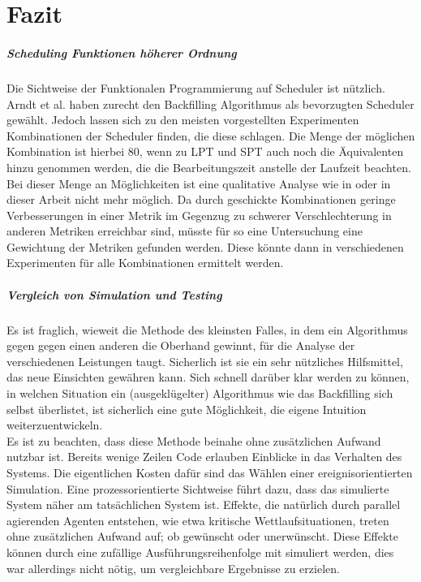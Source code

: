 \chapter{Fazit}

\paragraph{Scheduling Funktionen höherer Ordnung}
Die Sichtweise der Funktionalen Programmierung auf Scheduler ist nützlich. Arndt et al. \cite{Arn99} haben zurecht den Backfilling Algorithmus als bevorzugten Scheduler gewählt. Jedoch lassen sich zu den meisten vorgestellten Experimenten Kombinationen der Scheduler finden, die diese schlagen. Die Menge der möglichen Kombination ist hierbei 80, wenn zu LPT und SPT auch noch die Äquivalenten hinzu genommen werden, die die Bearbeitungszeit anstelle der Laufzeit beachten. Bei dieser Menge an Möglichkeiten ist eine qualitative Analyse wie in \cite{Arn99} oder in dieser Arbeit nicht mehr möglich. Da durch geschickte Kombinationen geringe Verbesserungen in einer Metrik im Gegenzug zu schwerer Verschlechterung in anderen Metriken erreichbar sind, müsste für so eine Untersuchung eine Gewichtung der Metriken gefunden werden. Diese könnte dann in verschiedenen Experimenten für alle Kombinationen ermittelt werden.


\paragraph{Vergleich von Simulation und Testing}
Es ist fraglich, wieweit die Methode des kleinsten Falles, in dem ein Algorithmus gegen gegen einen anderen die Oberhand gewinnt, für die Analyse der verschiedenen Leistungen taugt. Sicherlich ist sie ein sehr nützliches Hilfsmittel, das neue Einsichten gewähren kann. Sich schnell darüber klar werden zu können, in welchen Situation ein (ausgeklügelter) Algorithmus wie das Backfilling sich selbst überlistet, ist sicherlich eine gute Möglichkeit, die eigene Intuition weiterzuentwickeln.\\
Es ist zu beachten, dass diese Methode beinahe ohne zusätzlichen Aufwand nutzbar ist. Bereits wenige Zeilen Code erlauben Einblicke in das Verhalten des Systems. Die eigentlichen Kosten dafür sind das Wählen einer ereignisorientierten Simulation. Eine prozessorientierte Sichtweise führt dazu, dass das simulierte System näher am tatsächlichen System ist. Effekte, die natürlich durch parallel agierenden Agenten entstehen, wie etwa kritische Wettlaufsituationen, treten ohne zusätzlichen Aufwand auf; ob gewünscht oder unerwünscht. Diese Effekte können durch eine zufällige Ausführungsreihenfolge mit simuliert werden, dies war allerdings nicht nötig, um vergleichbare Ergebnisse zu erzielen.

